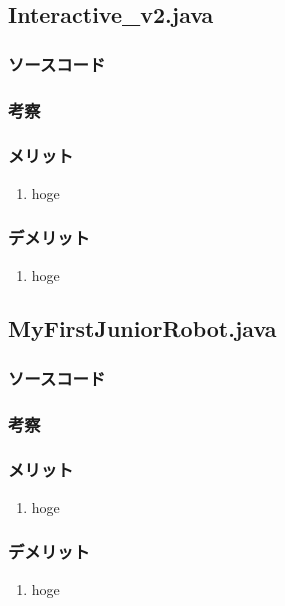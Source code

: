 \documentclass[12pt]{jarticle} %
\begin{document}
\begin{flushleft}
\subsection{Interactive\_v2.java}
\subsubsection{ソースコード}

\subsubsection{考察}
\subsubsection{メリット}
\begin{enumerate}
\item hoge
\end{enumerate}
\subsubsection{デメリット}
\begin{enumerate}
\item hoge
\end{enumerate}

\subsection{MyFirstJuniorRobot.java}
\subsubsection{ソースコード}

\subsubsection{考察}
\subsubsection{メリット}
\begin{enumerate}
\item hoge
\end{enumerate}
\subsubsection{デメリット}
\begin{enumerate}
\item hoge
\end{enumerate}


\end{flushleft}
\end{document}
